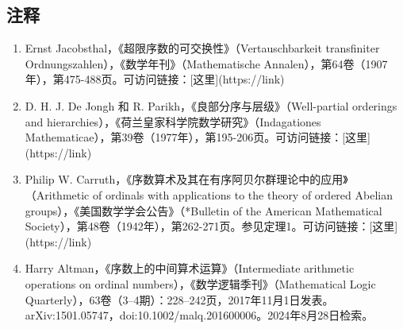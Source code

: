 \subsection{注释}
\begin{enumerate}
\item Ernst Jacobsthal，《超限序数的可交换性》（Vertauschbarkeit transfiniter Ordnungszahlen），《数学年刊》（Mathematische Annalen），第64卷（1907年），第475-488页。可访问链接：[这里](https://link)
\item D. H. J. De Jongh 和 R. Parikh，《良部分序与层级》（Well-partial orderings and hierarchies），《荷兰皇家科学院数学研究》（Indagationes Mathematicae），第39卷（1977年），第195-206页。可访问链接：[这里](https://link)
\item Philip W. Carruth，《序数算术及其在有序阿贝尔群理论中的应用》（Arithmetic of ordinals with applications to the theory of ordered Abelian groups），《美国数学学会公告》（*Bulletin of the American Mathematical Society），第48卷（1942年），第262-271页。参见定理1。可访问链接：[这里](https://link)
\item Harry Altman，《序数上的中间算术运算》（Intermediate arithmetic operations on ordinal numbers），《数学逻辑季刊》（Mathematical Logic Quarterly），63卷（3–4期）：228–242页，2017年11月1日发表。arXiv:1501.05747，doi:10.1002/malq.201600006。2024年8月28日检索。
\end{enumerate}